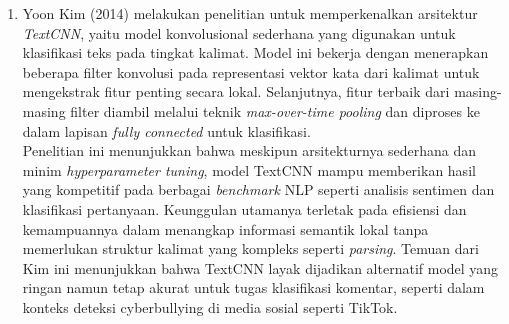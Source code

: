 \begin{enumerate}
    \item Yoon Kim (2014) melakukan penelitian untuk memperkenalkan arsitektur \textit{TextCNN}, yaitu model konvolusional sederhana yang digunakan untuk klasifikasi teks pada tingkat kalimat. Model ini bekerja dengan menerapkan beberapa filter konvolusi pada representasi vektor kata dari kalimat untuk mengekstrak fitur penting secara lokal. Selanjutnya, fitur terbaik dari masing-masing filter diambil melalui teknik \textit{max-over-time pooling} dan diproses ke dalam lapisan \textit{fully connected} untuk klasifikasi. \\
    Penelitian ini menunjukkan bahwa meskipun arsitekturnya sederhana dan minim \textit{hyperparameter tuning}, model TextCNN mampu memberikan hasil yang kompetitif pada berbagai \textit{benchmark} NLP seperti analisis sentimen dan klasifikasi pertanyaan. Keunggulan utamanya terletak pada efisiensi dan kemampuannya dalam menangkap informasi semantik lokal tanpa memerlukan struktur kalimat yang kompleks seperti \textit{parsing}. Temuan dari Kim ini menunjukkan bahwa TextCNN layak dijadikan alternatif model yang ringan namun tetap akurat untuk tugas klasifikasi komentar, seperti dalam konteks deteksi cyberbullying di media sosial seperti TikTok.
\end{enumerate}

\renewcommand{\arraystretch}{1.0} %

